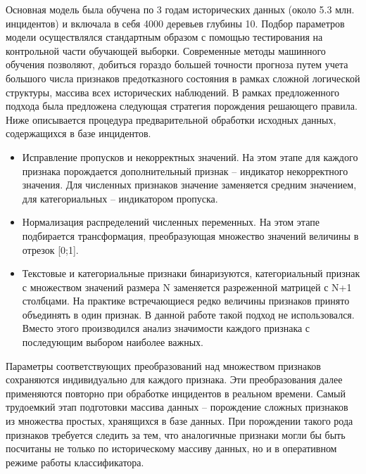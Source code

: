 Основная модель была обучена по 3 годам исторических данных (около 5.3 млн. инцидентов) и включала в себя 4000 деревьев глубины 10. Подбор параметров модели осуществлялся стандартным образом с помощью тестирования на контрольной части обучающей выборки.
Современные методы машинного обучения позволяют, добиться гораздо большей точности прогноза путем учета большого числа признаков предотказного состояния в рамках сложной логической структуры, массива всех исторических наблюдений. В рамках предложенного подхода была предложена следующая стратегия порождения решающего правила.
Ниже описывается процедура предварительной обработки исходных данных, содержащихся в базе инцидентов.
\begin{itemize}
\item Исправление пропусков и некорректных значений. На этом этапе для каждого признака порождается дополнительный признак – индикатор некорректного значения. Для численных признаков значение заменяется средним значением, для категориальных – индикатором пропуска.
\item Нормализация распределений численных переменных. На этом этапе подбирается трансформация, преобразующая множество значений величины в отрезок [0;1].
\item Текстовые и категориальные признаки бинаризуются, категориальный признак с множеством значений размера N заменяется разреженной матрицей с N+1 столбцами. На практике встречающиеся редко величины признаков принято объединять в один признак. В данной работе такой подход не использовался. Вместо этого производился анализ значимости каждого признака с последующим выбором наиболее важных.
\end{itemize}

Параметры соответствующих преобразований над множеством признаков сохраняются индивидуально для каждого признака. Эти преобразования далее применяются повторно при обработке инцидентов в реальном времени.
Самый трудоемкий этап подготовки массива данных – порождение сложных признаков из множества простых, хранящихся в базе данных. При порождении такого рода признаков требуется следить за тем, что аналогичные признаки могли бы быть посчитаны не только по историческому массиву данных, но и в оперативном режиме работы классификатора.

